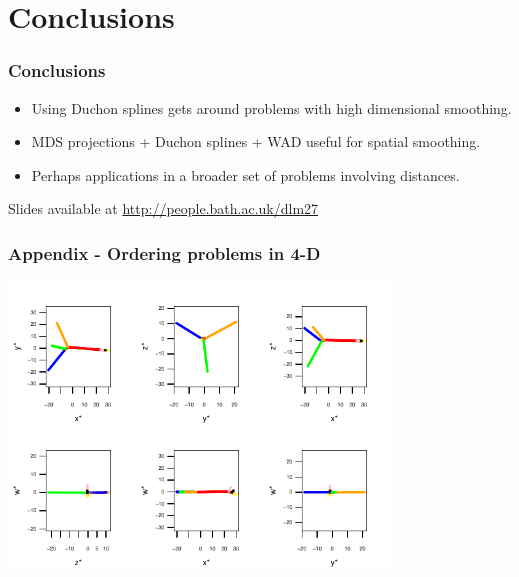 \documentclass[ignorenonframetext]{beamer} %
\newcommand{\bi}{\begin{itemize}}
\newcommand{\ei}{\end{itemize}}
\begin{document}


\section{Conclusions}

\begin{frame}
	\frametitle{Conclusions}
          \bi
            \item Using Duchon splines gets around problems with high dimensional smoothing.
            \item MDS projections + Duchon splines + WAD useful for spatial smoothing.
            \item Perhaps applications in a broader set of problems involving distances.
           \ei
        Slides available at \url{http://people.bath.ac.uk/dlm27}
\end{frame}


\begin{frame}
	\frametitle{Appendix - Ordering problems in 4-D}
	\centering
            \includegraphics[height=3in]{figs/comb-4d.pdf}	
\end{frame}
\end{document}
